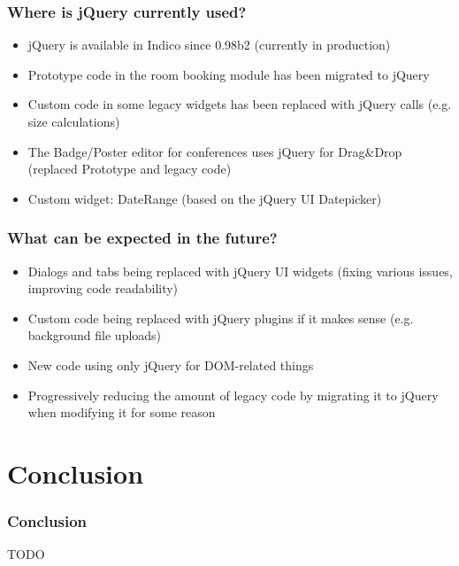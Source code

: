 \documentclass{beamer}
\begin{document}
\begin{frame}
  \frametitle{Where is jQuery currently used?}
  \begin{itemize}
    \item jQuery is available in Indico since 0.98b2 (currently in production)
    \item Prototype code in the room booking module has been migrated to jQuery
    \item Custom code in some legacy widgets has been replaced with jQuery calls (e.g. size calculations)
    \item The Badge/Poster editor for conferences uses jQuery for Drag\&Drop (replaced Prototype and
      legacy code)
    \item Custom widget: DateRange (based on the jQuery UI Datepicker)
  \end{itemize}

  \begin{center}
  \end{center}
\end{frame}

\begin{frame}
  \frametitle{What can be expected in the future?}
  \begin{itemize}
    \item Dialogs and tabs being replaced with jQuery UI widgets (fixing various issues, improving
      code readability)
    \item Custom code being replaced with jQuery plugins if it makes sense (e.g. background file
      uploads)
    \item New code using only jQuery for DOM-related things
    \item Progressively reducing the amount of legacy code by migrating it to jQuery when modifying
      it for some reason
  \end{itemize}
\end{frame}

\section{Conclusion}
\begin{frame}
  \frametitle{Conclusion}
  TODO
\end{frame}
\end{document}
